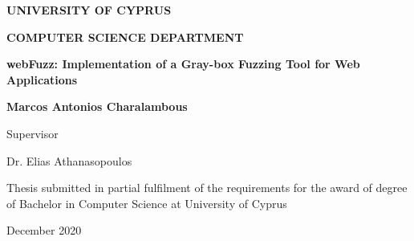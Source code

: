 \documentclass[12pt]{report}
\def\pname{webFuzz\xspace}
\def\ptitle{\pname: Implementation of a Gray-box Fuzzing Tool for Web Applications}
\begin{document}
\begin{titlepage}

\begin{center}
\LARGE{\textbf{\MakeUppercase{University of Cyprus}}}

\Large{\textbf{\MakeUppercase{Computer Science Department}}}

\vspace*{5cm}

\large{\textbf{\ptitle{}}}

\vspace*{0.5cm}

\large{\textbf{Marcos Antonios Charalambous}}

\vspace*{5cm}

\normalsize{Supervisor}

\normalsize{Dr. Elias Athanasopoulos}

\vspace*{3cm}

\normalsize{Thesis submitted in partial fulfilment of the requirements for the award of degree of Bachelor in Computer Science at University of Cyprus}

\vspace*{2cm}

\normalsize{December 2020}
\end{center}

\end{titlepage}


\setlength{\parindent}{0em}
\setlength{\parskip}{1.0em}



\newpage



\dominitoc
\tableofcontents
\listoffigures
\listoftables











\balance


\begin{appendices}
	\titlespacing*{\chapter}{0pt}{0pt}{0pt}
	
	
	\clearpage
\end{appendices}
\end{document}
